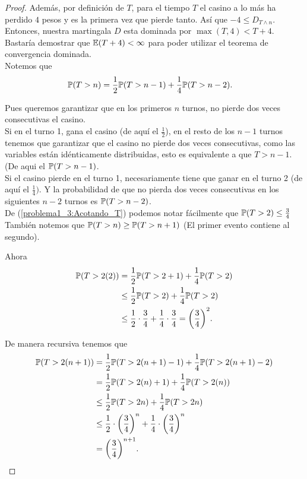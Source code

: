 \begin{proof}
		Además, por definición de $T$, para el tiempo $T$ el casino a lo más ha perdido $4$ pesos y es la primera vez que 
		pierde tanto. Así que $-4 \leq D_{T \wedge n}$.\\ 
		
		Entonces, nuestra martingala $D$ esta dominada por $\max(T, 4) < T + 4$. Bastaría demostrar que $\mathbb{E}(T+4) < \infty$ para poder
		utilizar el teorema de convergencia dominada.\\
		
		Notemos que 
		\begin{align}\label{problema1_3:Acotando_T}
			\mathbb{P}(T > n) &= \frac{1}{2} \mathbb{P}(T > n-1) + \frac{1}{4} \mathbb{P}(T > n-2). 
		\end{align}
		
		Pues queremos garantizar que en los primeros $n$ turnos, no pierde dos veces consecutivas el casino.\\
		
		Si en el turno 1, gana el casino (de aquí el $\frac{1}{2}$), en el resto de los $n-1$ turnos tenemos que garantizar que 
		el casino no pierde dos veces consecutivas, como las variables están idénticamente distribuidas, esto es equivalente a que
		$T>n-1$. (De aqui el $\mathbb{P}(T > n-1)$.\\
		
		Si el casino pierde en el turno 1, necesariamente tiene que ganar en el turno 2 (de aquí el $\frac{1}{4})$. Y la probabilidad
		de que no pierda dos veces consecutivas en los siguientes $n-2$ turnos es $\mathbb{P}(T > n-2)$.\\					    
		
		De (\ref{problema1_3:Acotando_T}) podemos notar fácilmente que $\mathbb{P}(T > 2) \leq \frac{3}{4}$\\
		
		También notemos que $\mathbb{P}(T > n ) \geq \mathbb{P}(T > n + 1)$ (El primer evento contiene al segundo).
		
		Ahora
		\begin{align}
			\mathbb{P}(T > 2 (2)) &=     \frac{1}{2} \mathbb{P}(T > 2+1) + \frac{1}{4} \mathbb{P}(T > 2) \\
						   &\leq  \frac{1}{2} \mathbb{P}(T > 2) + \frac{1}{4} \mathbb{P}(T > 2) \\
						   &\leq  \frac{1}{2} \cdot \frac{3}{4} + \frac{1}{4} \cdot \frac{3}{4} = \bigg(\frac{3}{4}\bigg)^2.
		\end{align}
		
		De manera recursiva tenemos que
		\begin{align}
			\mathbb{P}(T > 2(n+1)) &=     	\frac{1}{2} \mathbb{P}(T > 2(n+1) - 1) + \frac{1}{4} \mathbb{P}(T > 2(n+1) - 2) \\
							&=     	\frac{1}{2} \mathbb{P}(T > 2(n) + 1) + \frac{1}{4} \mathbb{P}(T > 2(n)) \\
							&\leq  	\frac{1}{2} \mathbb{P}(T > 2n) + \frac{1}{4} \mathbb{P}(T > 2n) \\
							&\leq  	\frac{1}{2} \cdot \bigg(\frac{3}{4}\bigg)^{n} + \frac{1}{4} \cdot \bigg(\frac{3}{4}\bigg)^{n} \\
							&=		\bigg(\frac{3}{4}\bigg)^{n+1}.
		\end{align}
		

\end{proof}
